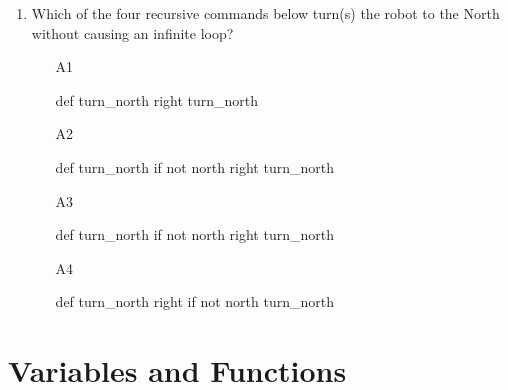 \begin{enumerate}
\begin{enumerate}
\end{enumerate}
\item Which of the four recursive commands below 
turn(s) the robot to the North without causing an infinite loop?
\begin{enumerate}
\item[A1]
\begin{bluecode}
def turn_north
    right
    turn_north
\end{bluecode}
\item[A2] 
\begin{bluecode}
def turn_north
    if not north
        right
    turn_north
\end{bluecode}
\item[A3] 
\begin{bluecode}
def turn_north
    if not north
        right
        turn_north
\end{bluecode}
\item[A4] 
\begin{bluecode}
def turn_north
    right
    if not north 
        turn_north
\end{bluecode}
\end{enumerate}
\end{enumerate}


\section{Variables and Functions}

